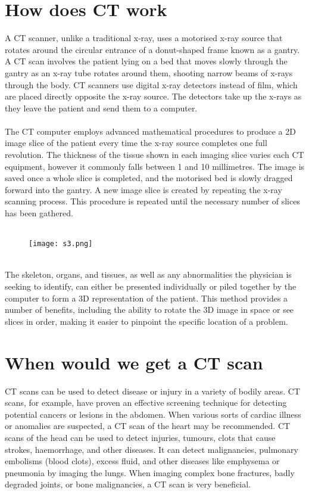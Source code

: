 \documentclass[12pt]{article}
\begin{document}
\section*{ \huge How does CT work}
A CT scanner, unlike a traditional x-ray, uses a motorised x-ray source that rotates around the circular entrance of a donut-shaped frame known as a gantry. A CT scan involves the patient lying on a bed that moves slowly through the gantry as an x-ray tube rotates around them, shooting narrow beams of x-rays through the body. CT scanners use digital x-ray detectors instead of film, which are placed directly opposite the x-ray source. The detectors take up the x-rays as they leave the patient and send them to a computer.
\\
\\
The CT computer employs advanced mathematical procedures to produce a 2D image slice of the patient every time the x-ray source completes one full revolution. The thickness of the tissue shown in each imaging slice varies each CT equipment, however it commonly falls between 1 and 10 millimetres. The image is saved once a whole slice is completed, and the motorised bed is slowly dragged forward into the gantry. A new image slice is created by repeating the x-ray scanning process. This procedure is repeated until the necessary number of slices has been gathered.
\\ 
\\
\begin{figure}[h]
\centering
\texttt{[image: s3.png]}
\end{figure}
\\
The skeleton, organs, and tissues, as well as any abnormalities the physician is seeking to identify, can either be presented individually or piled together by the computer to form a 3D representation of the patient. This method provides a number of benefits, including the ability to rotate the 3D image in space or see slices in order, making it easier to pinpoint the specific location of a problem.

\section*{ \huge When would we get a CT scan}

CT scans can be used to detect disease or injury in a variety of bodily areas. CT scans, for example, have proven an effective screening technique for detecting potential cancers or lesions in the abdomen. When various sorts of cardiac illness or anomalies are suspected, a CT scan of the heart may be recommended. CT scans of the head can be used to detect injuries, tumours, clots that cause strokes, haemorrhage, and other diseases. It can detect malignancies, pulmonary embolisms (blood clots), excess fluid, and other diseases like emphysema or pneumonia by imaging the lungs. When imaging complex bone fractures, badly degraded joints, or bone malignancies, a CT scan is very beneficial.
\end{document}
